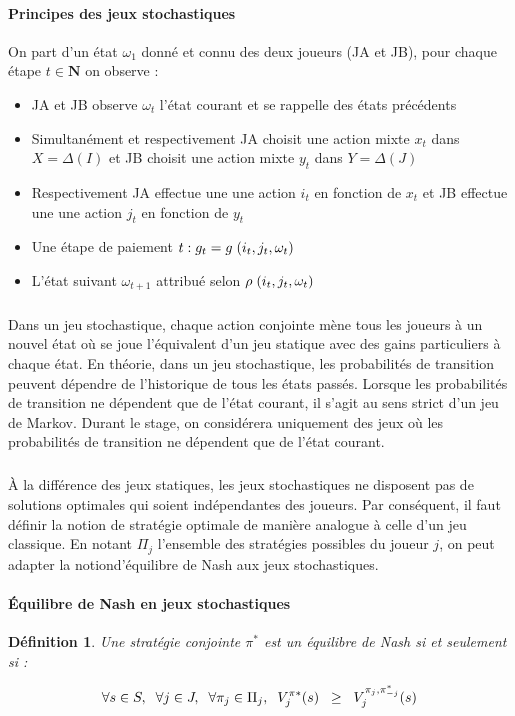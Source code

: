 \documentclass[a4paper, 12pt, twoside]{article}
\newtheorem{definition}{Définition}
\begin{document}
{{{{\paragraph{Principes des jeux stochastiques}
On part d'un état $\omega_{1}$ donné et connu des deux joueurs (\textsf{JA} et \textsf{JB}), pour chaque étape $t \in \mathbf{N}$ on observe :
\begin{itemize}
\item \textsf{JA} et \textsf{JB} observe $\omega_{t}$ l'état courant et se rappelle des états précédents
\item Simultanément et respectivement \textsf{JA} choisit une action mixte $x_{t}$ dans $X = \Delta (I)$ et \textsf{JB} choisit une action mixte $y_{t}$ dans $Y = \Delta (J)$ 
\item Respectivement \textsf{JA} effectue une une action $i_{t} $ en fonction de $x_{t}$ et \textsf{JB} effectue une une action $j_{t} $ en fonction de $y_{t}$
\item Une étape de paiement $t : g_{t} = g\hspace{0,1 cm} (i_{t},j_{t},\omega_{t})$ 
\item L'état suivant $\omega_{t+1}$ attribué selon $\rho \hspace{0,1 cm} (i_{t},j_{t},\omega_{t})$ 
\end{itemize}
\subparagraph*{}{Dans un jeu stochastique, chaque action conjointe mène tous les joueurs à un nouvel état où se joue l'équivalent d'un jeu statique avec des gains particuliers à chaque état. En théorie, dans un jeu stochastique, les probabilités de transition peuvent dépendre de l'historique de tous les états passés. Lorsque les probabilités de transition ne dépendent que de l'état courant, il s'agit au sens strict d'un jeu de Markov. Durant le stage, on considérera uniquement des jeux où les probabilités de transition ne dépendent que de l'état courant.}

\subparagraph*{}{À la différence des jeux statiques, les jeux stochastiques ne disposent pas de solutions optimales qui soient indépendantes des joueurs. Par conséquent, il faut définir la notion de stratégie optimale de manière analogue à celle d'un jeu classique. En notant $\Pi_{j}$ l'ensemble des stratégies possibles du joueur $j$, on peut adapter la notion\textsf{d'équilibre de Nash} aux jeux stochastiques.

\paragraph{Équilibre de Nash en jeux stochastiques}
\begin{definition}
Une stratégie conjointe $\pi^{*}$ est un équilibre de Nash si et seulement si : 
\end{definition}
\begin{align*}
\forall s \in S,\hspace{0,2 cm} \forall j \in J, \hspace{0,2 cm} \forall \pi_{j} \in \Pi_{j}, \hspace{0,2 cm} V_{j}^{\pi*}(s) \hspace{0,2 cm}\geq \hspace{0,2 cm} V_{j}^{\pi_{j},\pi_{-j}^{*}}(s)
\end{align*}
\newpage
}}}}}
\end{document}
